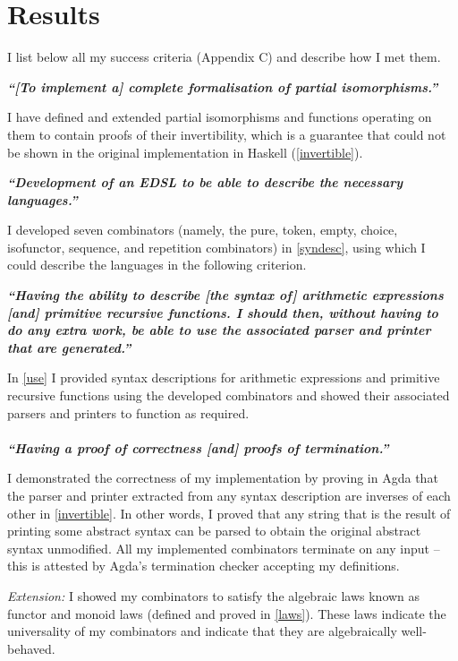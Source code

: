 \documentclass[12pt,a4paper,twoside,openright]{report}
\begin{document}
{\section{Results}

I list below all my success criteria (Appendix C) and describe how I met them.


\textbf{\textit{``[To implement a] complete formalisation of partial isomorphisms.''}}

I have defined and extended partial isomorphisms and functions operating on them to contain proofs of their invertibility, which is a guarantee that could not be shown in the original implementation in Haskell (\autoref{invertible}).

\textbf{\textit{``Development of an EDSL to be able to describe the necessary languages.''}}

I developed seven combinators (namely, the {pure}, {token}, {empty}, choice, isofunctor, sequence, and repetition combinators) in \autoref{syndesc}, using which I could describe the languages in the following criterion.

\textbf{\textit{``Having the ability to describe [the syntax of] arithmetic expressions [and] primitive recursive functions.  I should then, without having to do any extra work, be able to use the associated parser and printer that are generated.''}}

In \autoref{use} I provided syntax descriptions for arithmetic expressions and primitive recursive functions using the developed combinators and showed their associated parsers and printers to function as required.
\ \\\ \\
\textbf{\textit{``Having a proof of correctness [and] proofs of termination.''}}

I demonstrated the correctness of my implementation by proving in Agda that the parser and printer extracted from any syntax description are inverses of each other in \autoref{invertible}. In other words, I proved that any string that is the result of printing some abstract syntax can be parsed to obtain the original abstract syntax unmodified.  
All my implemented combinators terminate on any input -- this is attested by Agda's termination checker accepting my definitions.

\emph{Extension:} I showed my combinators to satisfy the algebraic laws known as functor and monoid laws (defined and proved in \autoref{laws}). These laws indicate the universality of my combinators and indicate that they are algebraically well-behaved.

}
\end{document}
